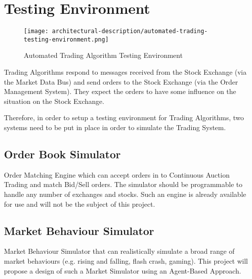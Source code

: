 \section{Testing Environment}

\begin{figure}[H]
\centerline{\texttt{[image: architectural-description/automated-trading-testing-environment.png]}}
\caption{Automated Trading Algorithm Testing Environment}
\label{fig:automated-trading-algorithm-testing-environment}
\end{figure}

Trading Algorithms respond to messages received from the Stock Exchange (via the Market Data Bus) and send orders to the Stock Exchange (via the Order Management System). They expect the orders to have some influence on the situation on the Stock Exchange. 

Therefore, in order to setup a testing environment for Trading Algorithms, two systems need to be put in place in order to simulate the Trading System.

\subsection{Order Book Simulator}
Order Matching Engine which can accept orders in to Continuous Auction Trading and match Bid/Sell orders. The simulator should be programmable to handle any number of exchanges and stocks. Such an engine is already available for use and will not be the subject of this project.

\subsection{Market Behaviour Simulator}
Market Behaviour Simulator that can realistically simulate a broad range of market behaviours (e.g. rising and falling, flash crash, gaming). This project will propose a design of such a Market Simulator using an Agent-Based Approach.
